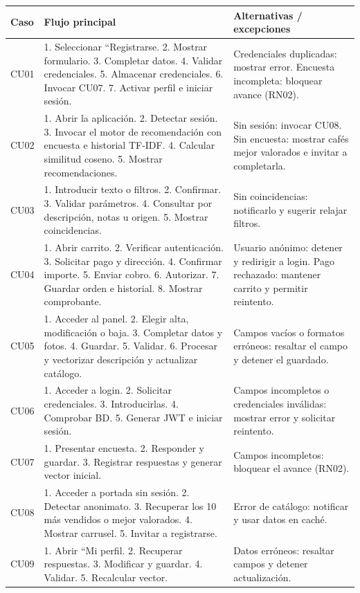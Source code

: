 \begin{longtable}{p{3cm}p{7.1cm}p{5.3cm}}
\hline\textbf{Caso}&\textbf{Flujo principal}&\textbf{Alternativas / excepciones}\\\hline
CU01&1. Seleccionar ``Registrarse. 2. Mostrar formulario. 3. Completar datos. 4. Validar credenciales. 5. Almacenar credenciales. 6. Invocar CU07. 7. Activar perfil e iniciar sesión.&Credenciales duplicadas: mostrar error. Encuesta incompleta: bloquear avance (RN02).\\
CU02&1. Abrir la aplicación. 2. Detectar sesión. 3. Invocar el motor de recomendación con encuesta e historial TF-IDF. 4. Calcular similitud coseno. 5. Mostrar recomendaciones.&Sin sesión: invocar CU08. Sin encuesta: mostrar cafés mejor valorados e invitar a completarla.\\
CU03&1. Introducir texto o filtros. 2. Confirmar. 3. Validar parámetros. 4. Consultar por descripción, notas u origen. 5. Mostrar coincidencias.&Sin coincidencias: notificarlo y sugerir relajar filtros.\\
CU04&1. Abrir carrito. 2. Verificar autenticación. 3. Solicitar pago y dirección. 4. Confirmar importe. 5. Enviar cobro. 6. Autorizar. 7. Guardar orden e historial. 8. Mostrar comprobante.&Usuario anónimo: detener y redirigir a login. Pago rechazado: mantener carrito y permitir reintento.\\
CU05&1. Acceder al panel. 2. Elegir alta, modificación o baja. 3. Completar datos y fotos. 4. Guardar. 5. Validar. 6. Procesar y vectorizar descripción y actualizar catálogo.&Campos vacíos o formatos erróneos: resaltar el campo y detener el guardado.\\
CU06&1. Acceder a login. 2. Solicitar credenciales. 3. Introducirlas. 4. Comprobar BD. 5. Generar JWT e iniciar sesión.&Campos incompletos o credenciales inválidas: mostrar error y solicitar reintento.\\
CU07&1. Presentar encuesta. 2. Responder y guardar. 3. Registrar respuestas y generar vector inicial.&Campos incompletos: bloquear el avance (RN02).\\
CU08&1. Acceder a portada sin sesión. 2. Detectar anonimato. 3. Recuperar los 10 más vendidos o mejor valorados. 4. Mostrar carrusel. 5. Invitar a registrarse.&Error de catálogo: notificar y usar datos en caché.\\
CU09&1. Abrir ``Mi perfil. 2. Recuperar respuestas. 3. Modificar y guardar. 4. Validar. 5. Recalcular vector.&Datos erróneos: resaltar campos y detener actualización.\\

\end{longtable}

